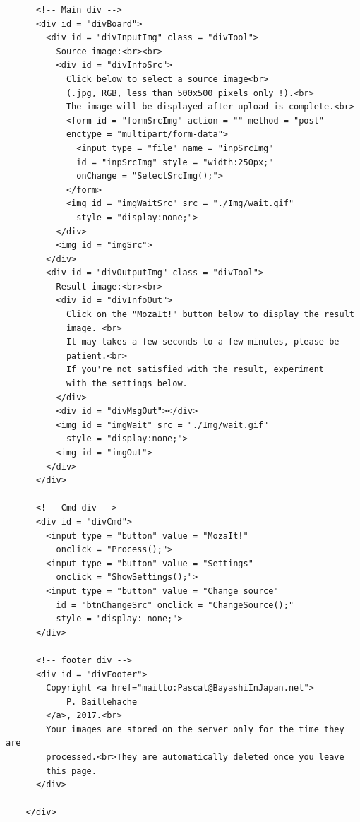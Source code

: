 \documentclass[12pt, a4paper]{article}
\begin{document}
\begin{scriptsize}
\begin{ttfamily}
\begin{lstlisting}
      <!-- Main div -->
      <div id = "divBoard">
        <div id = "divInputImg" class = "divTool">
          Source image:<br><br>
          <div id = "divInfoSrc">
            Click below to select a source image<br>
            (.jpg, RGB, less than 500x500 pixels only !).<br>
            The image will be displayed after upload is complete.<br>
            <form id = "formSrcImg" action = "" method = "post" 
            enctype = "multipart/form-data">
              <input type = "file" name = "inpSrcImg" 
              id = "inpSrcImg" style = "width:250px;" 
              onChange = "SelectSrcImg();">
            </form>
            <img id = "imgWaitSrc" src = "./Img/wait.gif" 
              style = "display:none;">
          </div>
          <img id = "imgSrc">
        </div>
        <div id = "divOutputImg" class = "divTool">
          Result image:<br><br>
          <div id = "divInfoOut">
            Click on the "MozaIt!" button below to display the result 
            image. <br>
            It may takes a few seconds to a few minutes, please be 
            patient.<br>
            If you're not satisfied with the result, experiment
            with the settings below.
          </div>
          <div id = "divMsgOut"></div>
          <img id = "imgWait" src = "./Img/wait.gif" 
            style = "display:none;">
          <img id = "imgOut">
        </div>
      </div>
      
      <!-- Cmd div -->
      <div id = "divCmd">
        <input type = "button" value = "MozaIt!" 
          onclick = "Process();">
        <input type = "button" value = "Settings" 
          onclick = "ShowSettings();">
        <input type = "button" value = "Change source" 
          id = "btnChangeSrc" onclick = "ChangeSource();" 
          style = "display: none;">
      </div>

      <!-- footer div -->
      <div id = "divFooter">
        Copyright <a href="mailto:Pascal@BayashiInJapan.net">
            P. Baillehache
        </a>, 2017.<br>
        Your images are stored on the server only for the time they are
        processed.<br>They are automatically deleted once you leave 
        this page.
      </div>

    </div>


\end{lstlisting}
\end{ttfamily}
\end{scriptsize}
\end{document}
